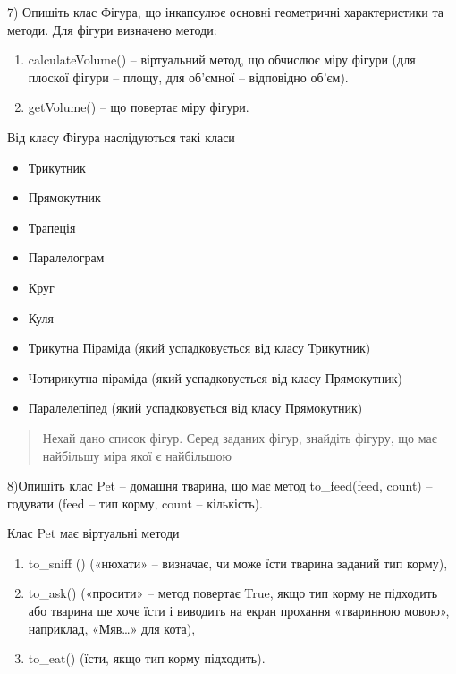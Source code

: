 \documentclass[]{article}
\begin{document}
7) Опишіть клас Фігура, що інкапсулює основні геометричні характеристики
та методи. Для фігури визначено методи:

\begin{enumerate}
\def\labelenumi{\arabic{enumi}.}
\item
  calculateVolume() -- віртуальний метод, що обчислює міру фігури (для
  плоскої фігури -- площу, для об'ємної -- відповідно об'єм).
\item
  getVolume() -- що повертає міру фігури.
\end{enumerate}

Від класу Фігура наслідуються такі класи

\begin{itemize}
\item
  Трикутник
\item
  Прямокутник
\item
  Трапеція
\item
  Паралелограм
\item
  Круг
\item
  Куля
\item
  Трикутна Піраміда (який успадковується від класу Трикутник)
\item
  Чотирикутна піраміда (який успадковується від класу Прямокутник)
\item
  Паралелепіпед (який успадковується від класу Прямокутник)
\end{itemize}

\begin{quote}
Нехай дано список фігур. Серед заданих фігур, знайдіть фігуру, що має
найбільшу міра якої є найбільшою
\end{quote}

8)Опишіть клас Pet -- домашня тварина, що має метод to\_feed(feed,
count) -- годувати (feed -- тип корму, count -- кількість).

Клас Pet має віртуальні методи

\begin{enumerate}
\def\labelenumi{\arabic{enumi}.}
\item
  to\_sniff () («нюхати» -- визначає, чи може їсти тварина заданий тип
  корму),
\item
  to\_ask() («просити» -- метод повертає True, якщо тип корму не
  підходить або тварина ще хоче їсти і виводить на екран прохання
  «тваринною мовою», наприклад, «Мяв\ldots{}» для кота),
\item
  to\_eat() (їсти, якщо тип корму підходить).
\end{enumerate}
\end{document}
